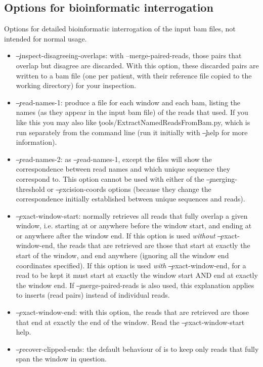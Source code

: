 \subsection{Options for bioinformatic interrogation} \label{sec:BioinfArgs}
Options for detailed bioinformatic interrogation of the input bam files, not intended for normal usage.
\begin{itemize}
\item \c{--inspect-disagreeing-overlaps}: with --merge-paired-reads, those pairs that overlap but disagree are discarded.
With this option, these discarded pairs are written to a bam file (one per patient, with their reference file copied to the working directory) for your inspection.
\item \c{--read-names-1}: produce a file for each window and each bam, listing the names (as they appear in the input bam file) of the reads that \pmt used.
If you like this you may also like \c{tools/ExtractNamedReadsFromBam.py}, which is run
separately from the command line (run it initially with \c{--help} for more information).
\item \c{--read-names-2}: as \c{--read-names-1}, except the files will show the correspondence between
read names and which unique sequence they correspond to.
This option cannot be used with either of the \c{--merging-threshold} or \c{--excision-coords} options (because they change the correspondence initially established between unique sequences and reads).
\item \c{--exact-window-start}: normally \pmt retrieves all reads that fully overlap a given window, i.e. starting at or anywhere before the window start, and ending at or anywhere after the window end.
If this option is used {\it without} \c{--exact-window-end}, the reads that are retrieved are those that start at exactly the start of the window, and end anywhere (ignoring all the window end coordinates specified).
If this option is used {\it with} \c{--exact-window-end}, for a read to be kept it must start at exactly the window start AND end at exactly the window end.
If \c{--merge-paired-reads} is also used, this explanation applies to inserts (read pairs) instead of individual reads.
\item \c{--exact-window-end}: with this option, the reads that are retrieved are those that end at
exactly the end of the window.
Read the \c{--exact-window-start} help.
\item \c{--recover-clipped-ends}: the default behaviour of \pmt is to keep only reads that fully span the window in question.

\end{itemize}
